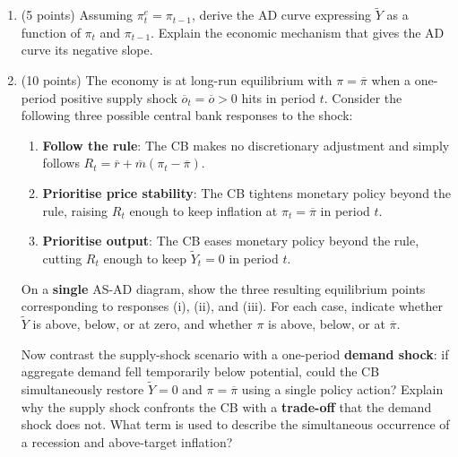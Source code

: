 \documentclass[letterpaper,12pt]{article}
\theoremstyle{dotlessS}
\begin{document}
\begin{enumerate}[label=(\alph*)]
\item (5 points) Assuming $\pi^e_t = \pi_{t-1}$, derive the AD curve expressing $\widetilde{Y}$ as a function of $\pi_t$ and $\pi_{t-1}$. Explain the economic mechanism that gives the AD curve its negative slope.

\item (10 points) The economy is at long-run equilibrium with $\pi = \overline{\pi}$ when a one-period positive supply shock $\overline{o}_t = \overline{o} > 0$ hits in period $t$. Consider the following three possible central bank responses to the shock:
\begin{enumerate}[label=\roman*.]
    \item \textbf{Follow the rule}: The CB makes no discretionary adjustment and simply follows $R_t = \overline{r} + \overline{m}(\pi_t - \overline{\pi})$.
    \item \textbf{Prioritise price stability}: The CB tightens monetary policy beyond the rule, raising $R_t$ enough to keep inflation at $\pi_t = \overline{\pi}$ in period $t$.
    \item \textbf{Prioritise output}: The CB eases monetary policy beyond the rule, cutting $R_t$ enough to keep $\widetilde{Y}_t = 0$ in period $t$.
\end{enumerate}
On a \textbf{single} AS-AD diagram, show the three resulting equilibrium points corresponding to responses (i), (ii), and (iii). For each case, indicate whether $\widetilde{Y}$ is above, below, or at zero, and whether $\pi$ is above, below, or at $\overline{\pi}$.

Now contrast the supply-shock scenario with a one-period \textbf{demand shock}: if aggregate demand fell temporarily below potential, could the CB simultaneously restore $\widetilde{Y} = 0$ and $\pi = \overline{\pi}$ using a single policy action? Explain why the supply shock confronts the CB with a \textbf{trade-off} that the demand shock does not. What term is used to describe the simultaneous occurrence of a recession and above-target inflation?
\end{enumerate}
\end{document}
